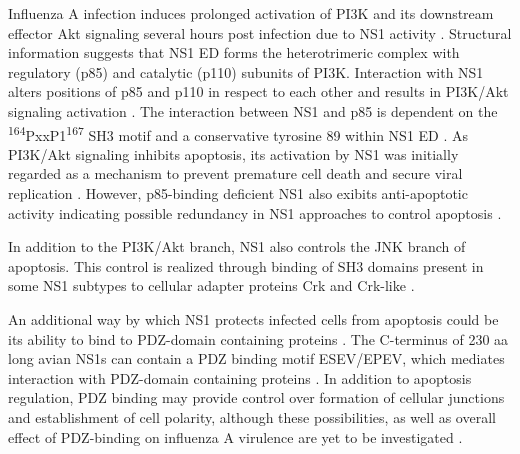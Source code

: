 		Influenza A infection induces prolonged activation of \gls{PI3K} and its downstream effector Akt signaling several hours post infection due to \gls{NS1} activity \parencite{Ehrhardt2006, Ehrhardt2009}. Structural information suggests that \gls{NS1} \gls{ED} forms the heterotrimeric complex with regulatory (p85) and catalytic (p110) subunits of \gls{PI3K}. Interaction with NS1 alters positions of p85 and p110 in respect to each other and results in \gls{PI3K}/Akt signaling activation \parencite{Hale2008d, Hale2010c}. The interaction between \gls{NS1} and p85 is dependent on the \textsuperscript{164}PxxP1\textsuperscript{167} \gls{SH3} motif and a conservative tyrosine 89 within \gls{NS1} \gls{ED} \parencite{Hale2006, Shin2007a, Shin2007}. As \gls{PI3K}/Akt signaling inhibits apoptosis, its activation by \gls{NS1} was initially regarded as a mechanism to prevent premature cell death and secure viral replication \parencite{Ehrhardt2007, Zhirnov2007}. However, p85-binding deficient \gls{NS1} also exibits anti-apoptotic activity indicating possible redundancy in NS1 approaches to control apoptosis \parencite{Jackson2010a}.
		
		In addition to the \gls{PI3K}/Akt branch, \gls{NS1} also controls the \gls{JNK} branch of apoptosis. This control is realized through binding of \gls{SH3} domains present in some \gls{NS1} subtypes to cellular adapter proteins Crk and Crk-like \parencite{Heikkinen2008, Hrincius2010}.
		
		An additional way by which \gls{NS1} protects infected cells from apoptosis could be its ability to bind to PDZ-domain containing proteins \parencite{Liu2010}. The C-terminus of 230 \gls{aa} long avian \gls{NS1}s can contain a PDZ binding motif ESEV/EPEV, which mediates interaction with PDZ-domain containing proteins \parencite{Golebiewski2011}. In addition to apoptosis regulation, PDZ binding may provide control over formation of cellular junctions and establishment of cell polarity, although these possibilities, as well as overall effect of PDZ-binding on influenza A virulence are yet to be investigated \parencite{Jackson2010, Zielecki2010, Javier2011}.
		
		
		
		
				
	
		
